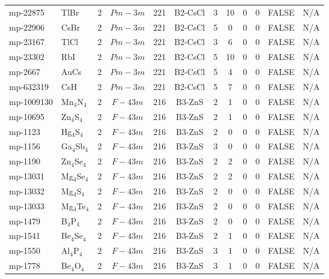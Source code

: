 {\begin{longtable}{llcccccccccc}
    mp-22875 & TlBr  & 2     & $Pm-3m$ & 221   & B2-CsCl & 3     & 10    & 0     & 0     & FALSE & N/A \\
    mp-22906 & CsBr  & 2     & $Pm-3m$ & 221   & B2-CsCl & 5     & 0     & 0     & 0     & FALSE & N/A \\
    mp-23167 & TlCl  & 2     & $Pm-3m$ & 221   & B2-CsCl & 3     & 6     & 0     & 0     & FALSE & N/A \\
    mp-23302 & RbI   & 2     & $Pm-3m$ & 221   & B2-CsCl & 5     & 10    & 0     & 0     & FALSE & N/A \\
    mp-2667 & AuCs  & 2     & $Pm-3m$ & 221   & B2-CsCl & 5     & 4     & 0     & 0     & FALSE & N/A \\
    mp-632319 & CsH   & 2     & $Pm-3m$ & 221   & B2-CsCl & 5     & 7     & 0     & 0     & FALSE & N/A \\
    mp-1009130 & Mn$_{4}$N$_{4}$ & 2     & $F-43m$ & 216   & B3-ZnS & 2     & 1     & 0     & 0     & FALSE & N/A \\
    mp-10695 & Zn$_{4}$S$_{4}$ & 2     & $F-43m$ & 216   & B3-ZnS & 2     & 1     & 0     & 0     & FALSE & N/A \\
    mp-1123 & Hg$_{4}$S$_{4}$ & 2     & $F-43m$ & 216   & B3-ZnS & 2     & 0     & 0     & 0     & FALSE & N/A \\
    mp-1156 & Ga$_{4}$Sb$_{4}$ & 2     & $F-43m$ & 216   & B3-ZnS & 3     & 0     & 0     & 0     & FALSE & N/A \\
    mp-1190 & Zn$_{4}$Se$_{4}$ & 2     & $F-43m$ & 216   & B3-ZnS & 2     & 2     & 0     & 0     & FALSE & N/A \\
    mp-13031 & Mg$_{4}$Se$_{4}$ & 2     & $F-43m$ & 216   & B3-ZnS & 2     & 2     & 0     & 0     & FALSE & N/A \\
    mp-13032 & Mg$_{4}$S$_{4}$ & 2     & $F-43m$ & 216   & B3-ZnS & 2     & 0     & 0     & 0     & FALSE & N/A \\
    mp-13033 & Mg$_{4}$Te$_{4}$ & 2     & $F-43m$ & 216   & B3-ZnS & 2     & 0     & 0     & 0     & FALSE & N/A \\
    mp-1479 & B$_{4}$P$_{4}$ & 2     & $F-43m$ & 216   & B3-ZnS & 2     & 0     & 0     & 0     & FALSE & N/A \\
    mp-1541 & Be$_{4}$Se$_{4}$ & 2     & $F-43m$ & 216   & B3-ZnS & 2     & 1     & 0     & 0     & FALSE & N/A \\
    mp-1550 & Al$_{4}$P$_{4}$ & 2     & $F-43m$ & 216   & B3-ZnS & 3     & 1     & 0     & 0     & FALSE & N/A \\
    mp-1778 & Be$_{4}$O$_{4}$ & 2     & $F-43m$ & 216   & B3-ZnS & 3     & 1     & 0     & 0     & FALSE & N/A \\

\end{longtable}}
